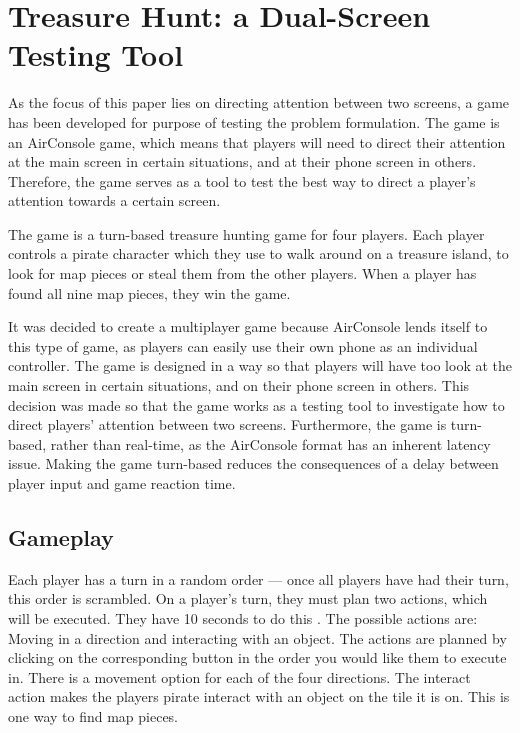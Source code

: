 \chapter{Treasure Hunt: a Dual-Screen Testing Tool}\label{ch:game}
 As the focus of this paper lies on directing attention between two screens, a game has been developed for purpose of testing the problem formulation. The game is an AirConsole game, which means that players will need to direct their attention at the main screen in certain situations, and at their phone screen in others. Therefore, the game serves as a tool to test the best way to direct a player's attention towards a certain screen.

The game is a turn-based treasure hunting game for four players. Each player controls a pirate character which they use to walk around on a treasure island, to look for map pieces or steal them from the other players. When a player has found all nine map pieces, they win the game.

It was decided to create a multiplayer game because AirConsole lends itself to this type of game, as players can easily use their own phone as an individual controller. The game is designed in a way so that players will have too look at the main screen in certain situations, and on their phone screen in others. This decision was made so that the game works as a testing tool to investigate how to direct players' attention between two screens. Furthermore, the game is turn-based, rather than real-time, as the AirConsole format has an inherent latency issue. Making the game turn-based reduces the consequences of a delay between player input and game reaction time. 

\section{Gameplay}
Each player has a turn in a random order --- once all players have had their turn, this order is scrambled. On a player's turn, they must plan two actions, which will be executed. They have 10 seconds to do this . The possible actions are: Moving in a direction and interacting with an object. The actions are planned by clicking on the corresponding button in the order you would like them to execute in. There is a movement option for each of the four directions. The interact action makes the players pirate interact with an object on the tile it is on. This is one way to find map pieces. 

